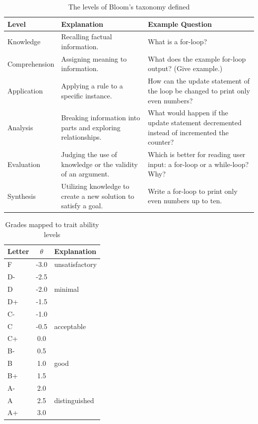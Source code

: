 \begin{table}[!p]
\label{tab:bloom}
\caption{The levels of Bloom's taxonomy defined}
\vspace{12pt}
\begin{tabularx}{\textwidth}{||l|X|X||}
\hline \hline
\rowcolor{Gray}
Level &  Explanation & Example Question \\\hline
Knowledge & Recalling factual information.   
& {What is a for-loop?}
\\ \hline
Comprehension & Assigning meaning to information.   
& {What does the example for-loop output? (Give example.)}
\\ \hline
Application & Applying a rule to a specific instance.   
& {How can the update statement of the loop be changed to print 
only even numbers?}
\\ \hline
Analysis 
& Breaking information into parts and exploring relationships.   
& {What would happen if the update statement decremented instead of incremented the counter?}
\\ \hline
Evaluation 
& Judging the use of knowledge or the validity of an
argument.   
& {Which is better for reading user input: a for-loop or a
while-loop? Why?} 
\\ \hline
Synthesis 
& Utilizing knowledge to create a new solution to
satisfy a goal.   
& {Write a for-loop to print only even numbers up to ten.}
\\ \hline \hline 
\end{tabularx}
\vspace{36pt}
\end{table}

\begin{table}[!p]
\label{tab:grades}
\caption{Grades mapped to trait ability levels}
\vspace{12pt}
\begin{tabularx}{\textwidth}{||l|c|X||}
\hline\hline
\rowcolor{Gray}
Letter  & $\theta$  & Explanation \\\hline
F  & -3.0   & unsatisfactory \\\hline
D- & -2.5   &                \\
D  & -2.0   & minimal        \\
D+ & -1.5   &                \\\hline
C- & -1.0   &                \\
C  & -0.5   & acceptable     \\
C+ & 0.0    &                \\\hline
B- & 0.5    &                \\
B  & 1.0    & good           \\
B+ & 1.5    &                \\\hline
A- & 2.0    &                \\
A  & 2.5    & distinguished  \\
A+ & 3.0    &                \\\hline\hline
\end{tabularx}
\vspace{36pt}
\end{table}


